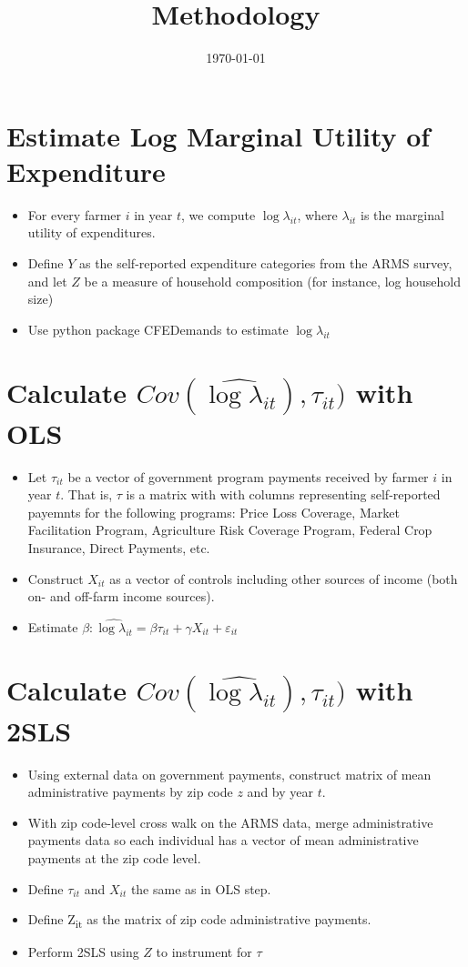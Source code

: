 \documentclass[11pt]{article}
\date{\today}
\title{Methodology}
\begin{document}
\maketitle
\section{Estimate Log Marginal Utility of Expenditure}
\label{sec:org51ae6c7}
\begin{itemize}
\item For every farmer \(i\) in year \(t\), we compute \(\log \lambda_{it}\), where \(\lambda_{it}\) is the marginal utility of expenditures.
\item Define \(Y\) as the self-reported expenditure categories from the ARMS survey, and let \(Z\) be a measure of household composition (for instance, log household size)
\item Use python package CFEDemands to estimate \(\log \lambda_{it}\)
\end{itemize}
\section{Calculate \(Cov(\hat{\log \lambda_{it}}), \tau_{it})\) with OLS}
\label{sec:orgcfd052b}
\begin{itemize}
\item Let \(\tau_{it}\) be a vector of government program payments received by farmer \(i\) in year \(t\). That is, \(\tau\) is a matrix with with columns representing self-reported payemnts for the following programs: Price Loss Coverage, Market Facilitation Program, Agriculture Risk Coverage Program, Federal Crop Insurance, Direct Payments, etc.
\item Construct \(X_{it}\) as a vector of controls including other sources of income (both on- and off-farm income sources).
\item Estimate \(\beta: \hat{\log \lambda_{it}} = \beta \tau_{it} + \gamma X_{it} + \varepsilon_{it}\)
\end{itemize}
\section{Calculate \(Cov(\hat{\log \lambda_{it}}), \tau_{it})\) with 2SLS}
\label{sec:org1ccfcf7}
\begin{itemize}
\item Using external data on government payments, construct matrix of mean administrative payments by zip code \(z\) and by year \(t\).
\item With zip code-level cross walk on the ARMS data, merge administrative payments data so each individual has a vector of mean administrative payments at the zip code level.
\item Define \(\tau_{it}\) and \(X_{it}\) the same as in OLS step.
\item Define Z\textsubscript{it} as the matrix of zip code administrative payments.
\item Perform 2SLS using \(Z\) to instrument for \(\tau\)
\end{itemize}
\end{document}
